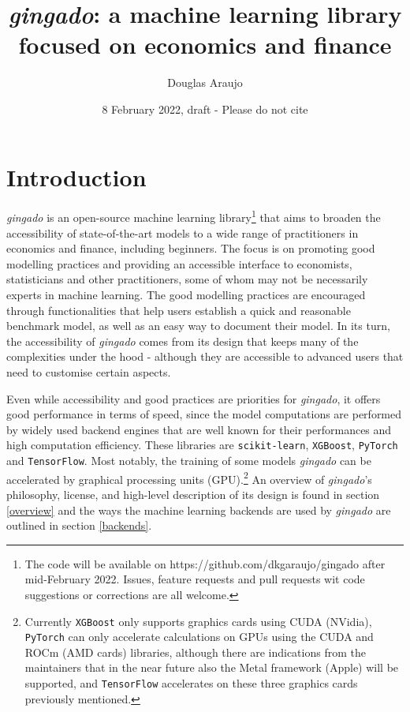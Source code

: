 \documentclass{article}
\title{\textit{gingado}: a machine learning library focused on economics and finance}
\author{Douglas Araujo}
\date{8 February 2022, draft - Please do not cite}
\begin{document}
\maketitle

\section{Introduction}
\textit{gingado} is an open-source machine learning library\footnote{The code will be available on https://github.com/dkgaraujo/gingado after mid-February 2022. Issues, feature requests and pull requests wit code suggestions or corrections are all welcome.} that aims to broaden the accessibility of state-of-the-art models to a wide range of practitioners in economics and finance, including beginners. The focus is on promoting good modelling practices and providing an accessible interface to economists, statisticians and other practitioners, some of whom may not be necessarily experts in machine learning. The good modelling practices are encouraged through functionalities that help users establish a quick and reasonable benchmark model, as well as an easy way to document their model. In its turn, the accessibility of \textit{gingado} comes from its design that keeps many of the complexities under the hood - although they are accessible to advanced users that need to customise certain aspects. 

Even while accessibility and good practices are priorities for \textit{gingado}, it offers good performance in terms of speed, since the model computations are performed by widely used backend engines that are well known for their performances and high computation efficiency. These libraries are \texttt{scikit-learn}, \texttt{XGBoost}, \texttt{PyTorch} and \texttt{TensorFlow}. Most notably, the training of some models \textit{gingado} can be accelerated by graphical processing units (GPU).\footnote{Currently \texttt{XGBoost} only supports graphics cards using CUDA (NVidia), \texttt{PyTorch} can only accelerate calculations on GPUs using the CUDA and ROCm (AMD cards) libraries, although there are indications from the maintainers that in the near future also the Metal framework (Apple) will be supported, and \texttt{TensorFlow} accelerates on these three graphics cards previously mentioned.} An overview of \textit{gingado}'s philosophy, license, and high-level description of its design is found in section \ref{overview} and the ways the machine learning backends are used by \textit{gingado} are outlined in section \ref{backends}.
\end{document}
